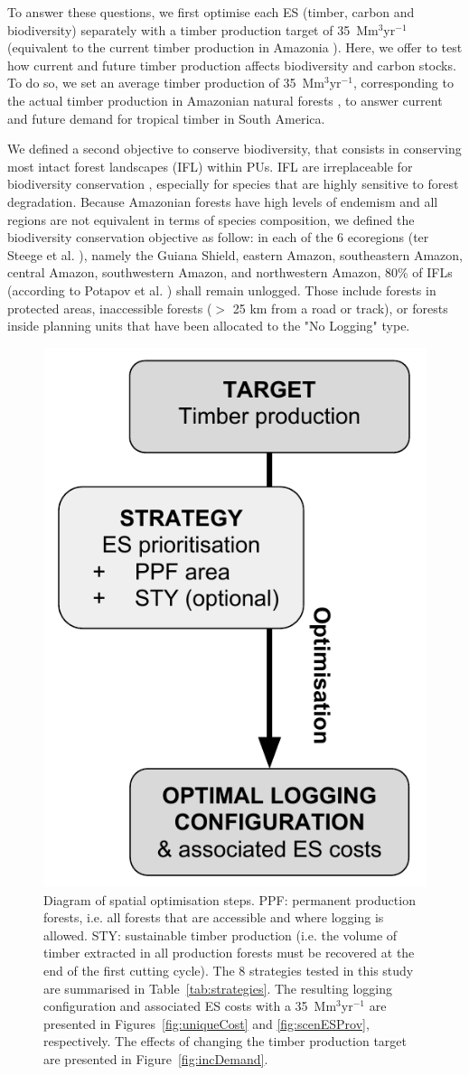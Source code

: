 \documentclass{article}
\begin{document}
To answer these questions, we first optimise each ES (timber, carbon and biodiversity) separately with a timber production target of 35~Mm$^3$yr$^{-1}$ (equivalent to the current timber production in Amazonia \cite{Lentini2005}).
Here, we offer to test how current and future timber production affects biodiversity and carbon stocks.  To do so, we set an average timber production of 35~Mm$^3$yr$^{-1}$, corresponding to the actual timber production in Amazonian natural forests \cite{Lentini2005}, to answer current and future demand for tropical timber in South America. 

We defined a second objective to conserve biodiversity, that consists in conserving most intact forest landscapes (IFL) within PUs. IFL are irreplaceable for biodiversity conservation \cite{Gibson2011}, especially for species that are highly sensitive to forest degradation. Because Amazonian forests have high levels of endemism and all regions are not equivalent in terms of species composition, we defined the biodiversity conservation objective as follow: in each of the 6 ecoregions (ter Steege et al. \cite{TerSteege2013}), namely the Guiana Shield, eastern Amazon, southeastern Amazon, central Amazon, southwestern Amazon, and northwestern Amazon, 80\% of IFLs (according to Potapov et al. \cite{Potapov2017}) shall remain unlogged. Those include forests in protected areas, inaccessible forests ($>$ 25 km from a road or track), or forests inside planning units that have been allocated to the "No Logging" type. 

\begin{figure}
    \centering
    \includegraphics[width = 0.4\linewidth]{graphs/diagramSpatOptim}
    \caption{Diagram of spatial optimisation steps. PPF: permanent production forests, i.e. all forests that are accessible and where logging is allowed. STY: sustainable timber production (i.e. the volume of timber extracted in all production forests must be recovered at the end of the first cutting cycle). The 8 strategies tested in this study are summarised in Table~\ref{tab:strategies}. The resulting logging configuration and associated ES costs with a 35~Mm$^3$yr$^{-1}$ are presented in Figures~\ref{fig:uniqueCost} and \ref{fig:scenESProv}, respectively. The effects of changing the timber production target are presented in Figure~\ref{fig:incDemand}.}
    \label{fig:basicDiagram}
\end{figure}
\end{document}
